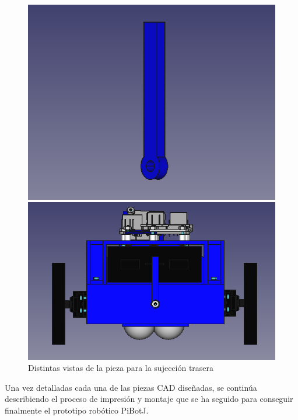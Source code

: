 \begin{figure}[ht!]
	\centering
	\begin{minipage}{0.45\linewidth}
		\centering
		\includegraphics[width=\linewidth]{figs/cap5/trasera2.png}
		\caption*{\centering}
	\end{minipage}
	\hspace{1cm}
	\begin{minipage}{0.45\linewidth}
		\centering
		\includegraphics[width=\linewidth]{figs/cap5/traseracon.png}
		\caption*{\centering}
	\end{minipage}
	\caption{Distintas vistas de la pieza para la sujección trasera}
	\label{fig:ptrasera}
\end{figure}

Una vez detalladas cada una de las piezas \acs{CAD} diseñadas, se continúa describiendo el proceso de impresión y montaje que se ha seguido para conseguir finalmente el prototipo robótico PiBotJ.
  
